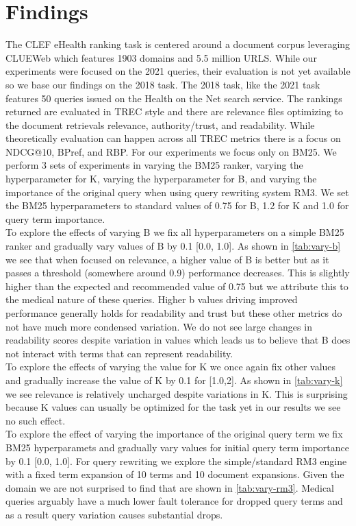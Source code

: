 \documentclass[11pt]{article}
\begin{document}
\section{Findings}
The CLEF eHealth ranking task is centered around a document corpus leveraging CLUEWeb which features 1903 domains and 5.5 million URLS. While our experiments were focused on the 2021 queries, their evaluation is not yet available so we base our findings on the 2018 task. The 2018 task, like the 2021 task features 50 queries issued on the Health on the Net search service. The rankings returned are evaluated in TREC style and there are relevance files optimizing to the document retrievals relevance, authority/trust, and readability. While theoretically evaluation can happen across all TREC metrics there is a focus on NDCG@10, BPref, and RBP. For our experiments we focus only on BM25. We perform 3 sets of experiments in varying the BM25 ranker, varying the hyperparameter for K, varying the hyperparameter for B, and varying the importance of the original query when using query rewriting system RM3. We set the BM25 hyperparameters to standard values of 0.75 for B, 1.2 for K and 1.0 for query term importance. \\
To explore the effects of varying B we fix all hyperparameters on a simple BM25 ranker and gradually vary values of B by 0.1 [0.0, 1.0]. As shown in \ref{tab:vary-b} we see that when focused on relevance, a higher value of B is better but as it passes a threshold (somewhere around 0.9) performance decreases. This is slightly higher than the expected and recommended value of 0.75 but we attribute this to the medical nature of these queries. Higher b values driving improved performance generally holds for readability and trust but these other metrics do not have much more condensed variation. We do not see large changes in readability scores despite variation in values which leads us to believe that B does not interact with terms that can represent readability. \\
To explore the effects of varying the value for K we once again fix other values and gradually increase the value of K by 0.1 for [1.0,2]. As shown in \ref{tab:vary-k} we see relevance is relatively uncharged despite variations in K. This is surprising because K values can usually be optimized for the task yet in our results we see no such effect.   \\
To explore the effect of varying the importance of the original query term we fix BM25 hyperparamets and gradually vary values for initial query term importance by 0.1 [0.0, 1.0]. For query rewriting we explore the simple/standard RM3 engine with a fixed term expansion of 10 terms and 10 document expansions. Given the domain we are not surprised to find that are shown in \ref{tab:vary-rm3}. Medical queries arguably have a much lower fault tolerance for dropped query terms and as a result query variation causes substantial drops. 
\end{document}
